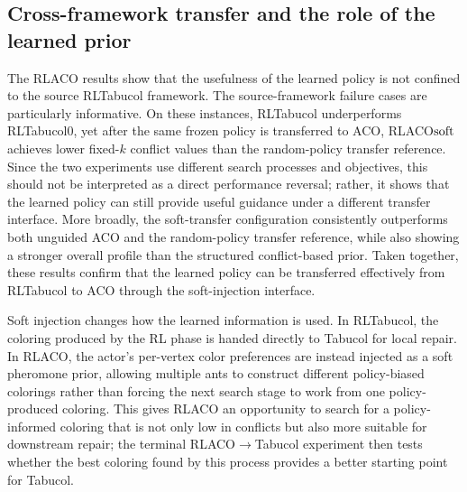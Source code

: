 \subsection{Cross-framework transfer and the role of the learned prior}
\label{ssec:discussion-transfer}

The RLACO results show that the usefulness of the learned policy is not
confined to the source RLTabucol framework. The source-framework failure cases are particularly informative. On these instances, RLTabucol underperforms RLTabucol$0$, yet after the same frozen policy is transferred to ACO, RLACO${\rm soft}$ achieves lower fixed-$k$ conflict values than the random-policy transfer reference. Since the two experiments use different search processes and objectives, this should not be interpreted as a direct performance reversal; rather, it shows that the learned policy can still provide useful guidance under a different transfer interface. More
broadly, the soft-transfer configuration consistently outperforms both unguided
ACO and the random-policy transfer reference, while also showing a stronger
overall profile than the structured conflict-based prior. Taken together, these results confirm that the learned policy can be transferred effectively from RLTabucol to ACO through the soft-injection interface.

Soft injection changes how the learned information is used. In RLTabucol, the
coloring produced by the RL phase is handed directly to Tabucol for local
repair. In RLACO, the actor's per-vertex color preferences are instead injected
as a soft pheromone prior, allowing multiple ants to construct different
policy-biased colorings rather than forcing the next search stage to work from
one policy-produced coloring. This gives RLACO an opportunity to search for a policy-informed coloring that is not only low in conflicts but also more suitable for downstream repair; the terminal RLACO$\rightarrow$Tabucol experiment then tests whether the best coloring found by this process provides a better starting point for Tabucol.

